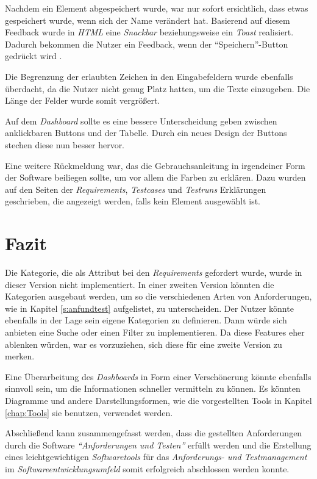 \documentclass[11pt,a4paper]{report}
\begin{document}
Nachdem ein Element abgespeichert wurde, war nur sofort ersichtlich, dass etwas gespeichert wurde, wenn sich der Name verändert hat. Basierend auf diesem Feedback wurde in \textit{HTML} eine \textit{Snackbar} beziehungsweise ein \textit{Toast} realisiert. Dadurch bekommen die Nutzer ein Feedback, wenn der "`Speichern"'-Button gedrückt wird \cite{snack}.

Die Begrenzung der erlaubten Zeichen in den Eingabefeldern wurde ebenfalls überdacht, da die Nutzer nicht genug Platz hatten, um die Texte einzugeben. Die Länge der Felder wurde somit vergrößert.

Auf dem \textit{Dashboard} sollte es eine bessere Unterscheidung geben zwischen anklickbaren Buttons und der Tabelle. Durch ein neues Design der Buttons stechen diese nun besser hervor.

Eine weitere Rückmeldung war, das die Gebrauchsanleitung in irgendeiner Form der Software beiliegen sollte, um vor allem die Farben zu erklären. Dazu wurden auf den Seiten der \textit{Requirements}, \textit{Testcases} und \textit{Testruns} Erklärungen geschrieben, die angezeigt werden, falls kein Element ausgewählt ist.




\chapter{Fazit} \label{chap:fazit}

Die Kategorie, die als Attribut bei den \textit{Requirements} gefordert wurde, wurde in dieser Version nicht implementiert. In einer zweiten Version könnten die Kategorien ausgebaut werden, um so die verschiedenen Arten von Anforderungen, wie in Kapitel \ref{s:anfundtest} aufgelistet, zu unterscheiden. Der Nutzer könnte ebenfalls in der Lage sein eigene Kategorien zu definieren. Dann würde sich anbieten eine Suche oder einen Filter zu implementieren. Da diese Features eher ablenken würden, war es vorzuziehen, sich diese für eine zweite Version zu merken.


Eine Überarbeitung des \textit{Dashboards} in Form einer Verschönerung könnte ebenfalls sinnvoll sein, um die Informationen schneller vermitteln zu können. Es könnten Diagramme und andere Darstellungsformen, wie die vorgestellten Tools in Kapitel \ref{chap:Tools} sie benutzen, verwendet werden.
 
 
Abschließend kann zusammengefasst werden, dass die gestellten Anforderungen durch die Software \textit{"`Anforderungen und Testen"'} erfüllt werden und die Erstellung eines leichtgewichtigen \textit{Softwaretools} für das \textit{Anforderungs- und Testmanagement} im \textit{Softwareentwicklungsumfeld} somit erfolgreich abschlossen werden konnte.
\end{document}
